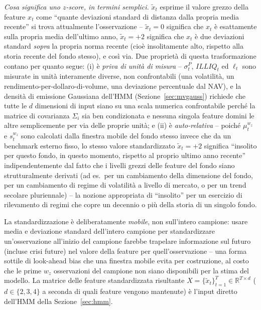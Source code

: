 \documentclass[11pt]{article}
\theoremstyle{definition}
\theoremstyle{remark}
\begin{document}
\begin{enumerate}
    \emph{Cosa significa uno $z$-score, in termini semplici.} $\widetilde{x}_t$ esprime il valore grezzo della feature $x_t$ come ``quante deviazioni standard di distanza dalla propria media recente'' si trova attualmente l'osservazione -- $\widetilde{x}_t=0$ significa che $x_t$ \`e esattamente sulla propria media dell'ultimo anno, $\widetilde{x}_t=+2$ significa che $x_t$ \`e due deviazioni standard \emph{sopra} la propria norma recente (cio\`e insolitamente alto, rispetto alla storia recente del fondo stesso), e cos\`i via. Due propriet\`a di questa trasformazione contano per quanto segue: (i) \`e \emph{priva di unit\`a di misura} -- $\sigma^P_t$, $ILLIQ_t$ ed $\ell_t$ sono misurate in unit\`a interamente diverse, non confrontabili (una volatilit\`a, un rendimento-per-dollaro-di-volume, una deviazione percentuale dal NAV), e la densit\`a di emissione Gaussiana dell'HMM (Sezione~\ref{sec:mvgauss}) richiede che tutte le $d$ dimensioni di input siano su una scala numerica confrontabile perch\'e la matrice di covarianza $\Sigma_i$ sia ben condizionata e nessuna singola feature domini le altre semplicemente per via delle proprie unit\`a; e (ii) \`e \emph{auto-relativa} -- poich\'e $\mu_t^{w_z}$ e $s_t^{w_z}$ sono calcolati dalla finestra mobile del fondo stesso invece che da un benchmark esterno fisso, lo stesso valore standardizzato $\widetilde x_t=+2$ significa ``insolito per questo fondo, in questo momento, rispetto al proprio ultimo anno recente'' indipendentemente dal fatto che i livelli grezzi delle feature del fondo siano strutturalmente derivati (ad es.\ per un cambiamento della dimensione del fondo, per un cambiamento di regime di volatilit\`a a livello di mercato, o per un trend secolare pluriennale) -- la nozione appropriata di ``insolito'' per un esercizio di rilevamento di regimi che copre un decennio o pi\`u della storia di un singolo fondo.
\end{enumerate}
La standardizzazione \`e deliberatamente \emph{mobile}, non sull'intero campione: usare media e deviazione standard dell'intero campione per standardizzare un'osservazione all'inizio del campione farebbe trapelare informazione sul futuro (incluse crisi future) nel valore della feature per quell'osservazione -- una forma sottile di look-ahead bias che una finestra mobile evita per costruzione, al costo che le prime $w_z$ osservazioni del campione non siano disponibili per la stima del modello. La matrice delle feature standardizzata risultante $X=\{\widetilde{x}_t\}_{t=1}^{T}\in\mathbb{R}^{T\times d}$ ($d\in\{2,3,4\}$ a seconda di quali feature vengono mantenute) \`e l'input diretto dell'HMM della Sezione~\ref{sec:hmm}.
\end{document}
